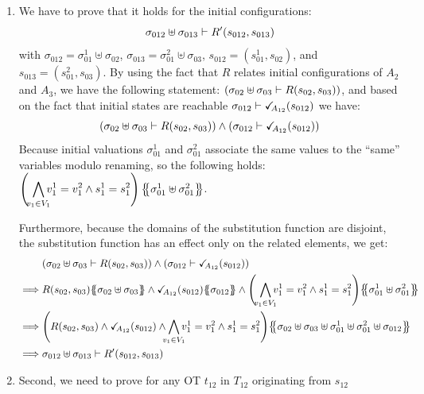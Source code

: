 \documentclass[runningheads]{llncs}
\begin{document}
\begin{enumerate}
\item We have to prove that it holds for the initial configurations:
\[\sigma_{012} \uplus \sigma_{013} \vdash R'{\left(s_{012}, s_{013}\right)}\]
with $\sigma_{012} = \sigma_{01}^1 \uplus \sigma_{02}$, $\sigma_{013} = \sigma_{01}^2 \uplus \sigma_{03}$, $s_{012}=(s_{01}^1,s_{02})$, and $s_{013}=(s_{01}^2,s_{03})$.
By using the fact that $R$ relates initial configurations of  $A_2$ and $A_3$, we have  the following statement:
${\left(\sigma_{02} \uplus \sigma_{03} \vdash R{\left(s_{02}, s_{03}\right)}\right)}$,  and based on the  fact that initial states are reachable $\sigma_{012} \vdash \checkmark_{\!\! A_{12}}{\left(s_{012}\right)}$ we have:
\[ {\left(\sigma_{02} \uplus \sigma_{03} \vdash R{\left(s_{02}, s_{03}\right)}\right)} \wedge 
{\left(\sigma_{012} \vdash \checkmark_{\!\! A_{12}}{\left(s_{012}\right)}\right)}\]
Because initial valuations $\sigma_{01}^1$ and $\sigma_{01}^2$ associate the same values to the ``same'' variables modulo renaming, so the following holds:\\ $\left(\,\,{\displaystyle \bigwedge_\subbox{v_1\in V_1} v^1_1=v^2_1\wedge s^1_1 = s^2_1}\right)\psubst{\sigma_{01}^1 \uplus \sigma_{01}^2 }$.

Furthermore, because  the domains of the substitution function are disjoint, the substitution function has an effect only on the related elements,  we get:
\begin{align*}
& \mpar{\sigma_{02} \uplus \sigma_{03} \vdash R\mpar{s_{02}, s_{03}}} \wedge 
\mpar{\sigma_{012} \vdash \reach{A_{12}}\mpar{s_{012}}}\\
\implies & R\mpar{s_{02}, s_{03}}\psubst{ \sigma_{02} \uplus \sigma_{03}} \wedge \reach{A_{12}}\mpar{s_{012}} \psubst{\sigma_{012}} \land \mpar{\,\, {\displaystyle \bigwedge_\subbox{v_1\in V_1} v^1_1=v^2_1\wedge s^1_1 = s^2_1}}\psubst{\sigma_{01}^1 \uplus \sigma_{01}^2 }\\
\implies & \mpar{R\mpar{s_{02}, s_{03}} \wedge \reach{A_{12}}\mpar{s_{012}}  \wedge \bigwedge_\subbox{v_1\in V_1}  v^1_1=v^2_1\wedge s^1_1 = s^2_1} \psubst{ \sigma_{02} \uplus \sigma_{03} \uplus \sigma^1_{01}\uplus \sigma^2_{01} \uplus \sigma_{012}}\\
\implies & \sigma_{012} \uplus \sigma_{013} \vdash R'\mpar{s_{012}, s_{013}}
\end{align*}

\item Second, we need to prove for any OT $t_{12}$ in $T_{12}$ originating from $s_{12}$


\end{enumerate}
\end{document}
